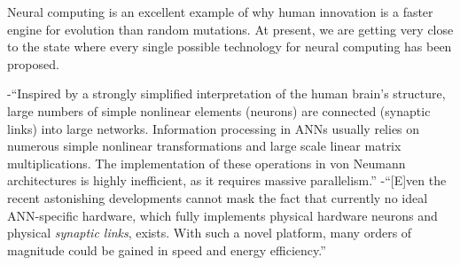 \vspace{3em}
Neural computing is an excellent example of why human innovation is a faster engine for evolution than random mutations. At present, we are getting very close to the state where every single possible technology for neural computing has been proposed.


\vspace{3em}
\cite{brpe2018}
-``Inspired by a strongly simplified interpretation of the human brain's structure, large numbers of simple nonlinear elements (neurons) are connected (synaptic links) into large networks. Information processing in ANNs usually relies on numerous simple nonlinear transformations and large scale linear matrix multiplications. The implementation of these operations in von Neumann architectures is highly inefficient, as it requires massive parallelism.''
-``[E]ven the recent astonishing developments cannot mask the fact that currently no ideal ANN-specific hardware, which fully implements physical hardware neurons and physical \textit{synaptic links}, exists. With such a novel platform, many orders of magnitude could be gained in speed and energy efficiency.''